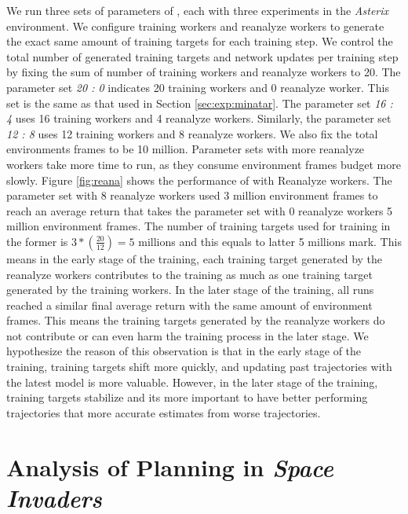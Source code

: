We run three sets of parameters of \moozi, each with three experiments in the \textit{Asterix} environment.
We configure training workers and reanalyze workers to generate the exact same amount of training targets for each training step.
We control the total number of generated training targets and network updates per training step by fixing the sum of number of training workers and reanalyze workers to 20.
The parameter set \textit{20 : 0} indicates 20 training workers and 0 reanalyze worker.
This set is the same as that used in Section \ref{sec:exp:minatar}.
The parameter set \textit{16 : 4} uses 16 training workers and 4 reanalyze workers.
Similarly, the parameter set \textit{12 : 8} uses 12 training workers and 8 reanalyze workers.
We also fix the total environments frames to be 10 million.
Parameter sets with more reanalyze workers take more time to run, as they consume environment frames budget more slowly.
Figure \ref{fig:reana} shows the performance of \moozi with Reanalyze workers.
The parameter set with 8 reanalyze workers used 3 million environment frames to reach an average return that takes the parameter set with 0 reanalyze workers 5 million environment frames.
The number of training targets used for training in the former is $3 * (\frac{20}{12}) = 5$ millions and this equals to latter 5 millions mark.
This means in the early stage of the training, each training target generated by the reanalyze workers contributes to the training as much as one training target generated by the training workers.
In the later stage of the training, all runs reached a similar final average return with the same amount of environment frames.
This means the training targets generated by the reanalyze workers do not contribute or can even harm the training process in the later stage.
We hypothesize the reason of this observation is that in the early stage of the training, training targets shift more quickly, and updating past trajectories with the latest model is more valuable.
However, in the later stage of the training, training targets stabilize and its more important to have better performing trajectories that more accurate estimates from worse trajectories.

\section{Analysis of Planning in \textit{Space Invaders}} \label{sec:exp:plan_space_invaders}

